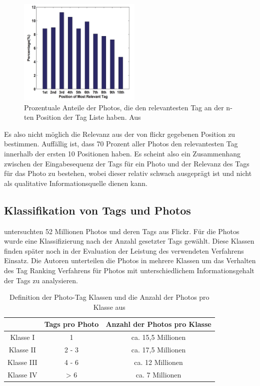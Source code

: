 \begin{figure}[htbp]
  \centering
    \includegraphics[height=2in]{images/tag_ranking_psotion_relevant_tag.png}
  \caption{Prozentuale Anteile der Photos, die den relevantesten Tag an der n-ten Position der Tag Liste haben. Aus \cite{ranking}}
  \label{fig:images_tag_ranking_psotion_relevant_tag}
\end{figure}
  
Es also nicht möglich die Relevanz aus der von flickr gegebenen Position zu bestimmen. Auffällig ist, dass 70 Prozent aller Photos den relevantesten Tag innerhalb der ersten 10 Positionen haben. Es scheint also ein Zusammenhang zwischen der Eingabesequenz der Tags für ein Photo und der Relevanz des Tags für das Photo zu bestehen, wobei dieser relativ schwach ausgeprägt ist und nicht als qualitative Informationsquelle dienen kann. 


\subsection{Klassifikation von Tags und Photos} %
\label{sub:klassifikation_von_tags}

\cite{collectiveKnowledge} untersuchten 52 Millionen Photos und deren Tags aus Flickr. Für die Photos wurde eine Klassifizierung nach der Anzahl gesetzter Tags gewählt. Diese Klassen finden später noch in der Evaluation der Leistung des verwendeten Verfahrens Einsatz. Die Autoren unterteilen die Photos in mehrere Klassen um das Verhalten des Tag Ranking Verfahrens für Photos mit unterschiedlichem Informationsgehalt der Tags zu analysieren.

\begin{table}[htbp]
\begin{tabular}{|c|c|c|} 
\hline
 & Tags pro Photo & Anzahl der Photos pro Klasse\\
\hline
Klasse I & 1 & ca. 15,5 Millionen\\
\hline
Klasse II & 2 - 3 & ca. 17,5 Millionen\\
\hline
Klasse III & 4 - 6 & ca. 12 Millionen\\
\hline
Klasse IV & > 6 & ca. 7 Millionen\\
\hline
\end{tabular}
\caption{Definition der Photo-Tag Klassen und die Anzahl der Photos pro Klasse aus \cite{collectiveKnowledge}}
\label{tab:classes_for_tags_collective}
\end{table}





